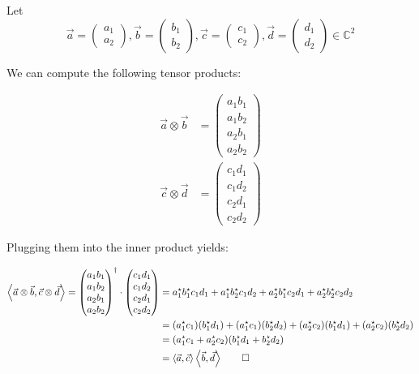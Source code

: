 \documentclass[a4paper,10pt]{hw}
\begin{document}
\subsubsection{}
Let 
$$
\vec{a} = \begin{pmatrix} a_1 \\ a_2 \end{pmatrix},
\vec{b} = \begin{pmatrix} b_1 \\ b_2 \end{pmatrix},
\vec{c} = \begin{pmatrix} c_1 \\ c_2 \end{pmatrix},
\vec{d} = \begin{pmatrix} d_1 \\ d_2 \end{pmatrix}
\in \mathbb{C}^2
$$ 

We can compute the following tensor products:


\begin{align*} 
\vec{a}\otimes\vec{b} &= \begin{pmatrix} a_1b_1\\a_1b_2\\a_2b_1\\a_2b_2 \end{pmatrix} \\
\vec{c}\otimes\vec{d} &= \begin{pmatrix} c_1d_1\\c_1d_2\\c_2d_1\\c_2d_2 \end{pmatrix}
\end{align*}

Plugging them into the inner product yields:

\begin{align*}
\left\langle\vec{a}\otimes\vec{b},\vec{c}\otimes\vec{d}\right\rangle
=
\begin{pmatrix} a_1b_1\\a_1b_2\\a_2b_1\\a_2b_2 \end{pmatrix}^\dagger
\cdot \begin{pmatrix} c_1d_1\\c_1d_2\\c_2d_1\\c_2d_2 \end{pmatrix}
&=
a_1^\star b_1^\star c_1 d_1
+ a_1^\star b_2^\star c_1 d_2
+ a_2^\star b_1^\star c_2 d_1
+ a_2^\star b_2^\star c_2 d_2 \\
&=
(a_1^\star c_1)(b_1^\star d_1)
+ (a_1^\star c_1)(b_2^\star d_2)
+ (a_2^\star c_2)(b_1^\star d_1)
+ (a_2^\star c_2)(b_2^\star d_2) \\
&=
(a_1^\star c_1 + a_2^\star c_2) (b_1^\star d_1 + b_2^\star d_2)\\
&= \left\langle \vec{a},\vec{c} \right\rangle 
	\left\langle \vec{b},\vec{d} \right\rangle \qed
\end{align*}
\end{document}
